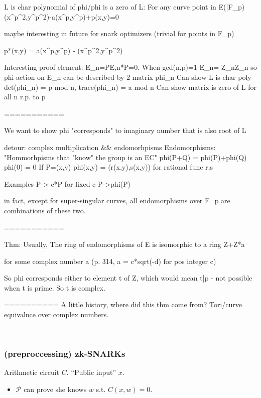 \documentclass[shadesubsections,trans,14pt,mathserif]{beamer}
\newcommand{\prv}{\ensuremath{\mathcal{P}}}
\begin{document}
L is char polynomial of phi/phi is a zero of L:
For any curve point in E(\bar{F}_p)
(x^p^2,y^p^2)-a(x^p,y^p)+p(x,y)=0

maybe interesting in future for snark optimizers (trivial for points in F_p)

p*(x,y) = a(x^p,y^p) - (x^p^2,y^p^2)


Interesting proof element:
E_n={P\in E,n*P=0}. When gcd(n,p)=1 E_n= Z_n\times Z_n
so phi action on E_n can be described by 2 matrix phi_n
Can show L is char poly
det(phi_n) = p mod n,   trace(phi_n) = a mod n
Can show matrix is zero of L for all n r.p. to p


===========

We want to show phi "corresponds" to imaginary number that is also root of L

detour: complex multiplication && endomorhpisms
Endomorphisms: 
"Hommorhpisms that "know" the group is an EC"
phi(P+Q) = phi(P)+phi(Q)
phi(0) = 0
If P=(x,y)
phi(x,y) = (r(x,y),s(x,y))
for rational func r,s

Examples
P-> c*P   for fixed c
P->phi(P) 

in fact, except for super-singular curves, all endomorphisms over F_p are combinations 
of these two.

===========

Thm:
Usually, 
The ring of endomorphisms of E is isomorphic to a ring
Z+Z*a

for some complex number a (p. 314, a = c*sqrt(-d) for pos integer c)

So phi corresponds either to element t of Z, which would mean t|p - not possible when t is prime.
So t is complex.

==========
A little history, where did this thm come from?
Tori/curve equivalnce over complex numbers.


===========














\begin{frame}
\frametitle{(preproccessing) zk-SNARKs}   %
Arithmetic circuit $C$. ``Public input'' $x$.
  \begin{itemize}
  \item $\prv$ can prove she knows $w$ s.t. $C(x,w)=0$.
  \end{itemize}
\end{frame}
\end{document}
